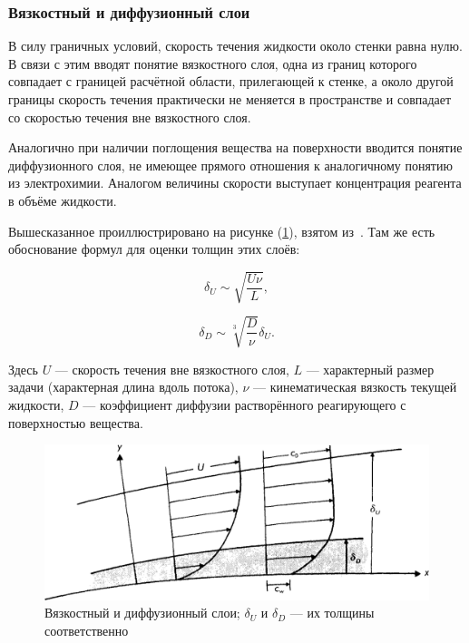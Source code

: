 \documentclass[oneside,final,12pt]{extreport}
\begin{document}
\subsubsection*{Вязкостный и диффузионный слои}
В силу граничных условий, скорость течения жидкости около стенки равна нулю.
В связи с этим вводят понятие вязкостного слоя, одна из границ которого
совпадает с границей расчётной области, прилегающей к стенке,
а около другой границы скорость течения практически не меняется в пространстве
и совпадает со скоростью течения вне вязкостного слоя.

Аналогично при наличии поглощения вещества на поверхности вводится понятие
диффузионного слоя, не имеющее прямого отношения к аналогичному понятию из
электрохимии.
Аналогом величины скорости выступает концентрация реагента в объёме жидкости.

Вышесказанное проиллюстрировано на рисунке (\ref{fig:visc_diff_layers}),
взятом из~\cite{bib:phys_chem_hydro_layers}.
Там же есть обоснование формул для оценки толщин этих слоёв:

\begin{equation}
  \delta_U \sim \sqrt{\frac{U\nu}{L}},
\label{eq:viscous_layer}
\end{equation}

\begin{equation}
  \delta_D \sim \sqrt[3]{\frac{D}{\nu}} \delta_U.
\label{eq:diffusion_layer}
\end{equation}

Здесь $U$ --- скорость течения вне вязкостного слоя,
$L$ --- характерный размер задачи (характерная длина вдоль потока),
$\nu$ --- кинематическая вязкость текущей жидкости,
$D$ --- коэффициент диффузии растворённого реагирующего с поверхностью вещества.


\begin{figure}
  \centering
  \includegraphics[width=.7\textwidth]{pic/visc_diff_layers}
  \caption{\label{fig:visc_diff_layers}%
    Вязкостный и диффузионный слои;
    $\delta_U$ и $\delta_D$ --- их толщины соответственно
  }

\end{figure}
\end{document}
